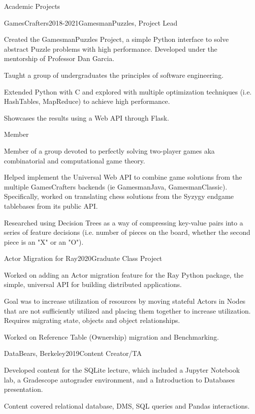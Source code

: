 \documentclass{resume} %
\begin{document}
\begin{rSection}{Academic Projects}

\begin{rSubsection}{GamesCrafters}{2018-2021}{GamesmanPuzzles, Project Lead}{}
	\item Created the GamesmanPuzzles Project, a simple Python interface to solve abstract Puzzle problems with high performance. Developed under the mentorship of Professor Dan Garcia.
	\item Taught a group of undergraduates the principles of software engineering.
	\item Extended Python with C and explored with multiple optimization techniques (i.e. HashTables, MapReduce) to achieve high performance.
	\item Showcases the results using a Web API through Flask.
\end{rSubsection}

\newpage

\begin{rSubsubsection}{Member}{}
	\item Member of a group devoted to perfectly solving two-player games aka combinatorial and computational game theory.
	\item Helped implement the Universal Web API to combine game solutions from the multiple GamesCrafters backends (ie GamesmanJava, GamesmanClassic). 
	Specifically, worked on translating chess solutions from the Syzygy endgame tablebases from its public API.
	\item Researched using Decision Trees as a way of compressing key-value pairs into a series of feature decisions (i.e. number of pieces on the board, whether the second piece is an "X" or an "O").
\end{rSubsubsection}

\begin{rSubsection}{Actor Migration for Ray}{2020}{Graduate Class Project}{}
	\item Worked on adding an Actor migration feature for the Ray Python package, the simple, universal API for building distributed applications.
	\item Goal was to increase utilization of resources by moving stateful Actors in Nodes that are not sufficiently utilized and placing them together to increase utilization. Requires migrating state, objects and object relationships. 
	\item Worked on Reference Table (Ownership) migration and Benchmarking.
\end{rSubsection}

\begin{rSubsection}{DataBears, Berkeley}{2019}{Content Creator/TA}{}
    \item Developed content for the SQLite lecture, which included a Jupyter Notebook lab, a Gradescope autograder environment, and a Introduction to Databases presentation.
    \item Content covered relational database, DMS, SQL queries and Pandas interactions.
\end{rSubsection}    

\end{rSection}
\end{document}
